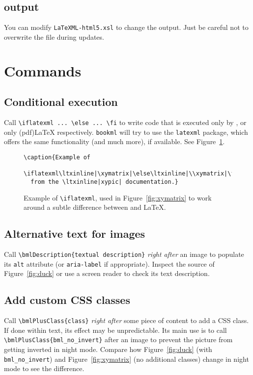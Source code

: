 \documentclass[a4paper,british]{article}
\def\ltxinline{\lstinline[style=bookml]}
\def\htmlinline{\lstinline[language=html]}
\begin{document}
\subsection{\HTML{} output}

You can modify \lstinline|LaTeXML-html5.xsl| to change the \HTML{} output. Just be careful not to overwrite the file during updates.

\section{Commands}

\subsection{Conditional execution}
Call \ltxinline|\iflatexml ... \else ... \fi| to write code that is executed only by \LaTeXML{}, or only (pdf)\LaTeX{} respectively. \lstinline|bookml| will try to use the \lstinline|latexml| package, which offers the same functionality (and much more), if available. See Figure~\ref{fig:iflatexml}.

\begin{figure}[hb]
  \begin{lstlisting}[style=bookml]
\caption{Example of
  \iflatexml\ltxinline|\xymatrix|\else\ltxinline|\\xymatrix|\fi{}
  from the \ltxinline|xypic| documentation.}
  \end{lstlisting}
  \caption{Example of \texttt{\textbackslash{}iflatexml}, used in Figure~\ref{fig:xymatrix} to work around a subtle difference between \LaTeXML{} and \LaTeX{}.}
  \label{fig:iflatexml}
\end{figure}

\subsection{Alternative text for images}
Call \ltxinline|\bmlDescription{textual description}| \emph{right after} an image to populate its \htmlinline|alt| attribute (or \ltxinline|aria-label| if appropriate). Inspect the \HTML{} source of Figure~\ref{fig:duck} or use a screen reader to check its text description.

\subsection{Add custom CSS classes}
Call \ltxinline|\bmlPlusClass{class}| \emph{right after} some piece of content to add a CSS class. If done within text, its effect may be unpredictable. Its main use is to call \ltxinline|\bmlPlusClass{bml_no_invert}| after an image to prevent the picture from getting inverted in night mode. Compare how Figure~\ref{fig:duck} (with \ltxinline|bml_no_invert|) and Figure~\ref{fig:xymatrix} (no additional classes) change in night mode to see the difference.
\end{document}
